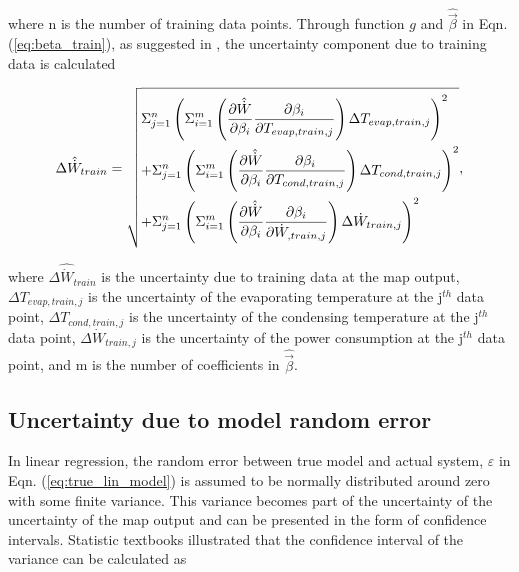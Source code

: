 where n is the number of training data points. Through function $g$ and $\hat{ \vec {\beta}}$ in Eqn. (\ref{eq:beta_train}), as suggested in \cite{song:2013}, the uncertainty component due to training data is calculated

\begin{equation}
\Delta {\hat{\dot{W}}_{train}} = \sqrt{\begin{gathered}
  \Sigma_{j=1}^n\left(\Sigma _{i = 1}^m\left(\frac{{\partial \hat{\dot{W}}}}{{\partial {\beta _i}}}\frac{{\partial {\beta _i}}}{{\partial {T_{evap,train,j}}}}\right)\Delta {T_{evap,train,j}}\right)^2  \hfill \\
  +\Sigma_{j=1}^n\left(\Sigma _{i = 1}^m\left(\frac{{\partial \hat{\dot{W}}}}{{\partial {\beta _i}}}\frac{{\partial {\beta _i}}}{{\partial {T_{cond,train,j}}}}\right)\Delta {T_{cond,train,j}}\right)^2 \hfill \\
   +\Sigma_{j=1}^n\left(\Sigma _{i = 1}^m\left(\frac{{\partial \hat{\dot{W}}}}{{\partial {\beta _i}}}\frac{{\partial {\beta _i}}}{{\partial {\dot{W}_{,train,j}}}}\right)\Delta {\dot{W}_{train,j}}\right)^2 \hfill \\ 
\end{gathered}}, 
\label{eq:uncer_w_train}
\end{equation}

where $\Delta {\hat{\dot{W}}_{train}}$ is the uncertainty due to training data at the map output, $\Delta {T_{evap,train,j}}$ is the uncertainty of the evaporating temperature at the j$^{th}$ data point, $\Delta {T_{cond,train,j}}$ is the uncertainty of the condensing temperature at the j$^{th}$ data point, $\Delta {\dot{W}_{train,j}}$ is the uncertainty of the power consumption at the j$^{th}$ data point, and m is the number of coefficients in $\hat{\vec{\beta}}$.

\subsection{Uncertainty due to model random error} \label{subsec:uncer_model}

In linear regression, the random error between true model and actual system, $\varepsilon$ in Eqn. (\ref{eq:true_lin_model}) is assumed to be normally distributed around zero with some finite variance. This variance becomes part of the uncertainty of the uncertainty of the map output and can be presented in the form of confidence intervals. Statistic textbooks \cite{Montgomery:2005,Graybill:1994} illustrated that the confidence interval of the variance can be calculated as

